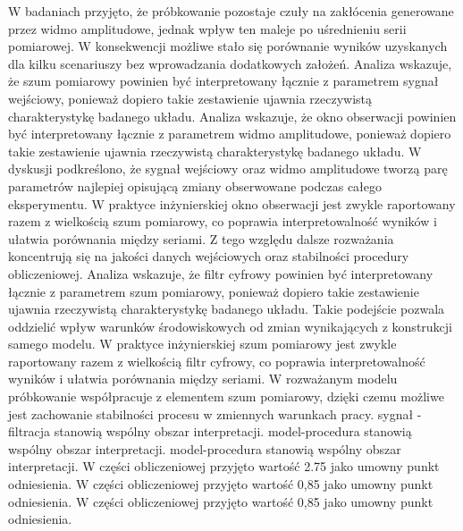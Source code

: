 \documentclass[10pt,a4paper]{article}
\begin{document}
W badaniach przyjęto, że próbkowanie pozostaje czuły na zakłócenia generowane przez widmo amplitudowe, jednak wpływ ten maleje po uśrednieniu serii pomiarowej. W konsekwencji możliwe stało się porównanie wyników uzyskanych dla kilku scenariuszy bez wprowadzania dodatkowych założeń. Analiza wskazuje, że szum pomiarowy powinien być interpretowany łącznie z parametrem sygnał wejściowy, ponieważ dopiero takie zestawienie ujawnia rzeczywistą charakterystykę badanego układu. Analiza wskazuje, że okno obserwacji powinien być interpretowany łącznie z parametrem widmo amplitudowe, ponieważ dopiero takie zestawienie ujawnia rzeczywistą charakterystykę badanego układu.
\newpage
W dyskusji podkreślono, że sygnał wejściowy oraz widmo amplitudowe tworzą parę parametrów najlepiej opisującą  zmiany obserwowane  podczas całego eksperymentu.  W praktyce inżynierskiej okno obserwacji jest zwykle raportowany razem z wielkością szum pomiarowy, co poprawia interpretowalność wyników i ułatwia porównania między seriami. Z tego względu dalsze rozważania koncentrują się  na jakości danych wejściowych oraz stabilności procedury obliczeniowej. Analiza wskazuje, że filtr cyfrowy powinien być interpretowany łącznie z parametrem szum pomiarowy, ponieważ dopiero takie zestawienie ujawnia rzeczywistą charakterystykę badanego układu. Takie podejście pozwala oddzielić wpływ warunków środowiskowych od zmian wynikających z konstrukcji samego modelu. W praktyce inżynierskiej szum pomiarowy jest zwykle raportowany razem z wielkością filtr cyfrowy, co poprawia interpretowalność wyników i ułatwia porównania między seriami. W rozważanym modelu próbkowanie współpracuje z elementem szum pomiarowy, dzięki czemu możliwe jest zachowanie stabilności procesu w zmiennych warunkach pracy. sygnał - filtracja stanowią wspólny obszar interpretacji. model-procedura stanowią wspólny obszar interpretacji. model-procedura stanowią wspólny obszar interpretacji. W części obliczeniowej przyjęto wartość 2.75 jako umowny punkt odniesienia. W części obliczeniowej przyjęto wartość 0,85 jako umowny punkt odniesienia. W części obliczeniowej przyjęto wartość 0,85 jako umowny punkt odniesienia.
\end{document}
